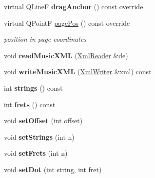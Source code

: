 \begin{DoxyCompactItemize}
virtual Q\+LineF {\bfseries drag\+Anchor} () const override
\item 
\mbox{\label{class_ms_1_1_fret_diagram_a78b1841b4b9cf505decb1446b137e8e2}} 
virtual Q\+PointF \hyperlink{class_ms_1_1_fret_diagram_a78b1841b4b9cf505decb1446b137e8e2}{page\+Pos} () const override
\begin{DoxyCompactList}\small\item\em position in page coordinates \end{DoxyCompactList}\item 
\mbox{\label{class_ms_1_1_fret_diagram_a56e68c244a3d8624c51b31e9689f7d5a}} 
void {\bfseries read\+Music\+X\+ML} (\hyperlink{class_ms_1_1_xml_reader}{Xml\+Reader} \&de)
\item 
\mbox{\label{class_ms_1_1_fret_diagram_ac5857285864def9ce95fe5a4b536acdc}} 
void {\bfseries write\+Music\+X\+ML} (\hyperlink{class_ms_1_1_xml_writer}{Xml\+Writer} \&xml) const
\item 
\mbox{\label{class_ms_1_1_fret_diagram_a3f67538e20677323e8fee07c1ac1041c}} 
int {\bfseries strings} () const
\item 
\mbox{\label{class_ms_1_1_fret_diagram_a0eb5f22c3ca5c3dcf5b094d8d9b73606}} 
int {\bfseries frets} () const
\item 
\mbox{\label{class_ms_1_1_fret_diagram_a1c05777af9cb18825aac98720e782889}} 
void {\bfseries set\+Offset} (int offset)
\item 
\mbox{\label{class_ms_1_1_fret_diagram_a563d1adacdf5e24005a6318e88d783ec}} 
void {\bfseries set\+Strings} (int n)
\item 
\mbox{\label{class_ms_1_1_fret_diagram_a840cce3e7639206f4c5283fbc2606945}} 
void {\bfseries set\+Frets} (int n)
\item 
\mbox{\label{class_ms_1_1_fret_diagram_aa248eb9ec478d311e9d7385b94cea963}} 
void {\bfseries set\+Dot} (int string, int fret)
\item 

\end{DoxyCompactItemize}
